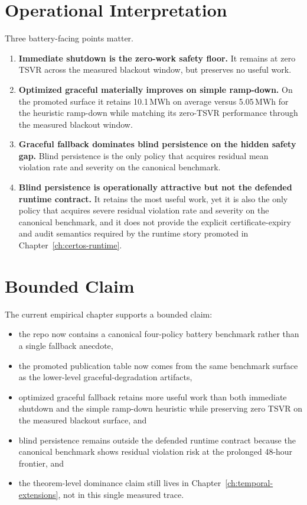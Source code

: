 \section{Operational Interpretation}

Three battery-facing points matter.

\begin{enumerate}
  \item \textbf{Immediate shutdown is the zero-work safety floor.}  It remains
    at zero TSVR across the measured blackout window, but preserves no useful
    work.
  \item \textbf{Optimized graceful materially improves on simple ramp-down.}
    On the promoted surface it retains 10.1\,MWh on average versus
    5.05\,MWh for the heuristic ramp-down while matching its zero-TSVR
    performance through the measured blackout window.
  \item \textbf{Graceful fallback dominates blind persistence on the hidden
    safety gap.}  Blind persistence is the only policy that acquires residual
    mean violation rate and severity on the canonical benchmark.
  \item \textbf{Blind persistence is operationally attractive but not the
    defended runtime contract.}  It retains the most useful work, yet it is
    also the only policy that acquires severe residual violation rate and
    severity on the canonical benchmark, and it does not provide the explicit
    certificate-expiry and audit semantics required by the runtime story
    promoted in Chapter~\ref{ch:certos-runtime}.
\end{enumerate}

\section{Bounded Claim}

The current empirical chapter supports a bounded claim:

\begin{itemize}
  \item the repo now contains a canonical four-policy battery benchmark rather
    than a single fallback anecdote,
  \item the promoted publication table now comes from the same benchmark
    surface as the lower-level graceful-degradation artifacts,
  \item optimized graceful fallback retains more useful work than both
    immediate shutdown and the simple ramp-down heuristic while preserving
    zero TSVR on the measured blackout surface, and
  \item blind persistence remains outside the defended runtime contract because
    the canonical benchmark shows residual violation risk at the prolonged
    48-hour frontier, and
  \item the theorem-level dominance claim still lives in
    Chapter~\ref{ch:temporal-extensions}, not in this single measured trace.
\end{itemize}

